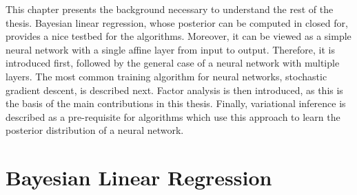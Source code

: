\documentclass[msc,deptreport.inf]{infthesis} %
\begin{document}
This chapter presents the background necessary to understand the rest of the thesis. Bayesian linear regression, whose posterior can be computed in closed for, provides a nice testbed for the algorithms. Moreover, it can be viewed as a simple neural network with a single affine layer from input to output. Therefore, it is introduced first, followed by the general case of a neural network with multiple layers. The most common training algorithm for neural networks, stochastic gradient descent, is described next. Factor analysis is then introduced, as this is the basis of the main contributions in this thesis. Finally, variational inference is described as a pre-requisite for algorithms which use this approach to learn the posterior distribution of a neural network. 

\section{Bayesian Linear Regression}\label{sec:bayesian_lr}
\end{document}
